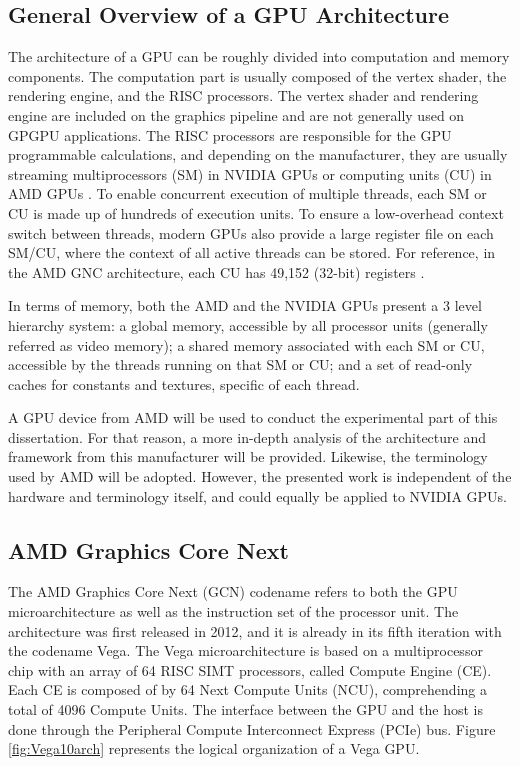 \subsection{General Overview of a GPU Architecture}
The architecture of a GPU can be roughly divided into computation and memory components. The computation part is usually composed of the vertex shader, the rendering engine, and the RISC processors. The vertex shader and rendering engine are included on the graphics pipeline and are not generally used on GPGPU applications. The RISC processors are responsible for the GPU programmable calculations, and depending on the manufacturer, they are usually streaming multiprocessors (SM) in NVIDIA GPUs \cite{nvidia_cuda_2008} or computing units (CU) in AMD GPUs \cite{amd_amd_2008}.  To enable concurrent execution of multiple threads, each SM or CU is made up of hundreds of execution units. To ensure a low-overhead context switch between threads, modern GPUs also provide a large register file on each SM/CU, where the context of all active threads can be stored. For reference, in the AMD GNC architecture, each CU has 49,152 (32-bit) registers \cite{jing_energy-efficient_2013}.

In terms of memory, both the AMD and the NVIDIA GPUs present a 3 level hierarchy system: a global memory, accessible by all processor units (generally referred as video memory); a shared memory associated with each SM or CU, accessible by the threads running on that SM or CU; and a set of read-only caches for constants and textures, specific of each thread.

A GPU device from AMD will be used to conduct the experimental part of this dissertation. For that reason, a more in-depth analysis of the architecture and framework from this manufacturer will be provided. Likewise, the terminology used by AMD will be adopted. However, the presented work is independent of the hardware and terminology itself, and could equally be applied to NVIDIA GPUs.

\subsection{AMD Graphics Core Next}

The AMD Graphics Core Next (GCN) \cite{amd_radeons_nodate} codename refers to both the GPU microarchitecture as well as the instruction set of the processor unit. The architecture was first released in 2012, and it is already in its fifth iteration with the codename Vega. The Vega microarchitecture is based on a multiprocessor chip with an array of 64 RISC SIMT processors, called Compute Engine (CE). Each CE is composed of by 64 Next Compute Units (NCU), comprehending a total of 4096 Compute Units. The interface between the GPU and the host is done through the Peripheral Compute Interconnect Express (PCIe) bus. Figure \ref{fig:Vega10arch} represents the logical organization of a Vega GPU.  

